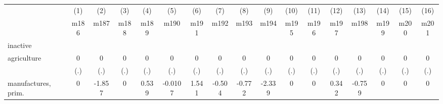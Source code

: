 {
\def\sym#1{\ifmmode^{#1}\else\(^{#1}\)\fi}
\begin{tabular}{l*{16}{c}}
\hline\hline
                    &\multicolumn{1}{c}{(1)}&\multicolumn{1}{c}{(2)}&\multicolumn{1}{c}{(3)}&\multicolumn{1}{c}{(4)}&\multicolumn{1}{c}{(5)}&\multicolumn{1}{c}{(6)}&\multicolumn{1}{c}{(7)}&\multicolumn{1}{c}{(8)}&\multicolumn{1}{c}{(9)}&\multicolumn{1}{c}{(10)}&\multicolumn{1}{c}{(11)}&\multicolumn{1}{c}{(12)}&\multicolumn{1}{c}{(13)}&\multicolumn{1}{c}{(14)}&\multicolumn{1}{c}{(15)}&\multicolumn{1}{c}{(16)}\\
                    &\multicolumn{1}{c}{m186}&\multicolumn{1}{c}{m187}&\multicolumn{1}{c}{m188}&\multicolumn{1}{c}{m189}&\multicolumn{1}{c}{m190}&\multicolumn{1}{c}{m191}&\multicolumn{1}{c}{m192}&\multicolumn{1}{c}{m193}&\multicolumn{1}{c}{m194}&\multicolumn{1}{c}{m195}&\multicolumn{1}{c}{m196}&\multicolumn{1}{c}{m197}&\multicolumn{1}{c}{m198}&\multicolumn{1}{c}{m199}&\multicolumn{1}{c}{m200}&\multicolumn{1}{c}{m201}\\
\hline
inactive            &                     &                     &                     &                     &                     &                     &                     &                     &                     &                     &                     &                     &                     &                     &                     &                     \\
agriculture         &           0         &           0         &           0         &           0         &           0         &           0         &           0         &           0         &           0         &           0         &           0         &           0         &           0         &           0         &           0         &           0         \\
                    &         (.)         &         (.)         &         (.)         &         (.)         &         (.)         &         (.)         &         (.)         &         (.)         &         (.)         &         (.)         &         (.)         &         (.)         &         (.)         &         (.)         &         (.)         &         (.)         \\
[1em]
manufactures, prim. &           0         &      -1.857         &           0         &       0.539         &     -0.0107         &       1.541         &      -0.504         &      -0.772         &      -2.339         &           0         &           0         &       0.342         &      -0.759         &           0         &           0         &           0         \\

\end{tabular}}
